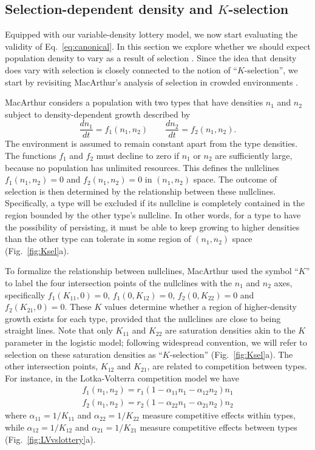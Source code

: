 \documentclass[12pt]{article}
\begin{document}
\subsection*{Selection-dependent density and $K$-selection}

Equipped with our variable-density lottery model, we now start evaluating the validity of Eq.~\eqref{eq:canonical}. In this section we explore whether we should expect population density to vary as a result of selection \citep{prout_1980}. Since the idea that density does vary with selection is closely connected to the notion of ``$K$-selection'', we start by revisiting MacArthur's analysis of selection in crowded environments \citep{macarthur_1967}. 

MacArthur considers a population with two types that have densities $n_1$ and $n_2$ subject to density-dependent growth described by
\begin{equation}
\frac{d n_1}{d t}=f_1(n_1,n_2)\qquad\frac{d n_2}{d t}=f_2(n_1,n_2). \label{eq:macgeneral}
\end{equation}
The environment is assumed to remain constant apart from the type densities. The functions $f_1$ and $f_2$ must decline to zero if $n_1$ or $n_2$ are sufficiently large, because no population has unlimited resources. This defines the nullclines $f_1(n_1,n_2)=0$ and $f_2(n_1,n_2)=0$ in $(n_1,n_2)$ space. The outcome of selection is then determined by the relationship between these nullclines. Specifically, a type will be excluded if its nullcline is completely contained in the region bounded by the other type's nullcline. In other words, for a type to have the possibility of persisting, it must be able to keep growing to higher densities than the other type can tolerate in some region of $(n_1,n_2)$ space (Fig.~\ref{fig:Ksel}a).

To formalize the relationship between nullclines, MacArthur used the symbol ``$K$'' to label the four intersection points of the nullclines with the $n_1$ and $n_2$ axes, specifically $f_1(K_{11},0)=0$, $f_1(0,K_{12})=0$, $f_2(0,K_{22})=0$ and $f_2(K_{21},0)=0$. These $K$ values determine whether a region of higher-density growth exists for each type, provided that the nullclines are close to being straight lines. Note that only $K_{11}$ and $K_{22}$ are saturation densities akin to the $K$ parameter in the logistic model; following widespread convention, we will refer to selection on these saturation densities as ``$K$-selection'' (Fig.~\ref{fig:Ksel}a). The other intersection points, $K_{12}$ and $K_{21}$, are related to competition between types. For instance, in the Lotka-Volterra competition model we have
\begin{align}
f_1(n_1,n_2) = r_1(1-\alpha_{11}n_1-\alpha_{12}n_2)n_1\nonumber\\
f_2(n_1,n_2) = r_2(1-\alpha_{22}n_1-\alpha_{21}n_2)n_2\label{eq:LV}
\end{align}
where $\alpha_{11}=1/K_{11}$ and $\alpha_{22}=1/K_{22}$ measure competitive effects within types, while $\alpha_{12}=1/K_{12}$ and $\alpha_{21}=1/K_{21}$ measure competitive effects between types (Fig.~\ref{fig:LVvslottery}a). 
\end{document}
